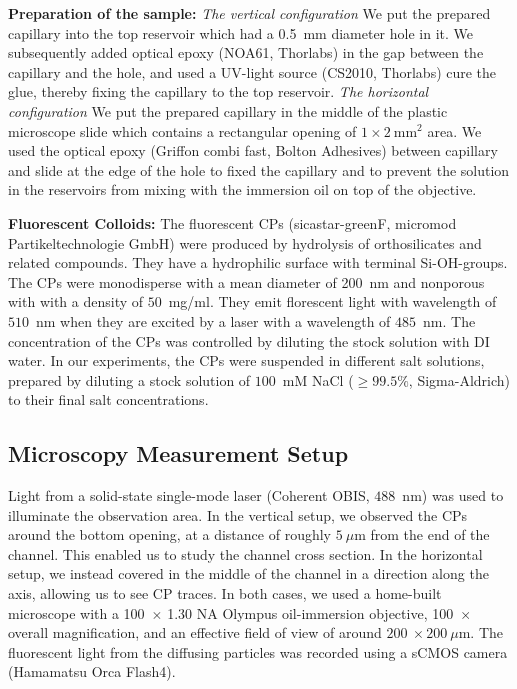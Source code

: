 \documentclass[twoside,twocolumn,9pt]{article}
\begin{document}
\textbf{Preparation of the sample:} \textit{The vertical configuration} We put the prepared capillary into the top reservoir which had a 0.5~mm diameter hole in it. We subsequently added optical epoxy (NOA61, Thorlabs) in the gap between the capillary and the hole, and used a UV-light source (CS2010, Thorlabs) cure the glue, thereby fixing the capillary to the top reservoir. \textit{The horizontal configuration} We put the prepared capillary in the middle of the plastic microscope slide which contains a rectangular opening of $1\times2~\mathrm{mm}^{2}$ area. We used the optical epoxy (Griffon combi fast, Bolton Adhesives) between capillary and slide at the edge of the hole to fixed the capillary and to prevent the solution in the reservoirs from mixing with the immersion oil on top of the objective.

\textbf{Fluorescent Colloids:} The fluorescent CPs (sicastar-greenF, micromod Partikeltechnologie GmbH) were produced by hydrolysis of orthosilicates and related compounds. They have a hydrophilic surface with terminal Si-OH-groups. The CPs were monodisperse with a mean diameter of 200~nm and nonporous with with a density of $50$~mg/ml. They emit florescent light with wavelength of $510$~nm when they are excited by a laser with a wavelength of $485$~nm. The concentration of the CPs was controlled by diluting the stock solution with DI water. In our experiments, the CPs were suspended in different salt solutions, prepared by diluting a stock solution of $100$~mM NaCl ($\geq 99.5\%$, Sigma-Aldrich) to their final salt concentrations.

\subsection*{Microscopy Measurement Setup}

Light from a solid-state single-mode laser (Coherent OBIS, $488$~nm) was used to illuminate the observation area. In the vertical setup, we observed the CPs around the bottom opening, at a distance of roughly $5~\mu$m from the end of the channel. This enabled us to study the channel cross section. In the horizontal setup, we instead covered in the middle of the channel in a direction along the axis, allowing us to see CP traces. In both cases, we used a home-built microscope with a 100~$\times$ 1.30 NA Olympus oil-immersion objective, 100~$\times$ overall magnification, and an effective field of view of around $200~\times 200~\mu$m. The fluorescent light from the diffusing particles was recorded using a sCMOS camera (Hamamatsu Orca Flash4).
\end{document}
